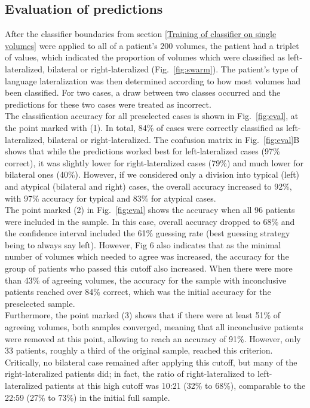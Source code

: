\documentclass[fleqn,10pt]{SelfArx} %
\begin{document}
\subsection{Evaluation of predictions} \label{Evaluation of predictions}

After the classifier boundaries from section \ref{Training of classifier on single volumes} were applied to all of a patient’s 200 volumes, the patient had a triplet of values, which indicated the proportion of volumes which were classified as left-lateralized, bilateral or right-lateralized (Fig.~\ref{fig:swarm}). The patient’s type of language lateralization was then determined according to how most volumes had been classified. For two cases, a draw between two classes occurred and the predictions for these two cases were treated as incorrect.\\
The classification accuracy for all preselected cases is shown in Fig.~\ref{fig:eval}, at the point marked with (1). In total, 84\% of cases were correctly classified as left-lateralized, bilateral or right-lateralized. The confusion matrix in Fig.~\ref{fig:eval}B shows that while the predictions worked best for left-lateralized cases (97\% correct), it was slightly lower for right-lateralized cases (79\%) and much lower for bilateral ones (40\%). However, if we considered only a division into typical (left) and atypical (bilateral and right) cases, the overall accuracy increased to 92\%, with 97\% accuracy for typical and 83\% for atypical cases.\\
The point marked (2) in Fig.~\ref{fig:eval} shows the accuracy when all 96 patients were included in the sample. In this case, overall accuracy dropped to 68\% and the confidence interval included the 61\% guessing rate (best guessing strategy being to always say left). However, Fig 6 also indicates that as the minimal number of volumes which needed to agree was increased, the accuracy for the group of patients who passed this cutoff also increased. When there were more than 43\% of agreeing volumes, the accuracy for the sample with inconclusive patients reached over 84\% correct, which was the initial accuracy for the preselected sample.\\
Furthermore, the point marked (3) shows that if there were at least 51\% of agreeing volumes, both samples converged, meaning that all inconclusive patients were removed at this point, allowing to reach an accuracy of 91\%. However, only 33 patients, roughly a third of the original sample, reached this criterion. Critically, no bilateral case remained after applying this cutoff, but many of the right-lateralized patients did; in fact, the ratio of right-lateralized to left-lateralized patients at this high cutoff was 10:21 (32\% to 68\%), comparable to the 22:59 (27\% to 73\%) in the initial full sample.\\
\end{document}
